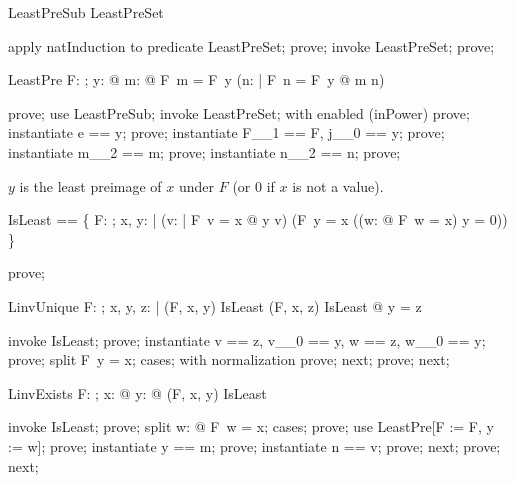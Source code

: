\documentclass{article}
\begin{document}
\begin{theorem}{LeastPreSub}
  \nat \subseteq LeastPreSet
\end{theorem}

\begin{zproof}
apply natInduction to predicate \nat \subseteq LeastPreSet;
prove;
invoke LeastPreSet;
prove;
\end{zproof}

\begin{theorem}{LeastPre}
  \forall F: \nat \fun \nat; y: \nat @ \exists m: \nat @ F~m = F~y \land (\forall n: \nat | F~n = F~y @ m \leq n)
\end{theorem}

\begin{zproof}
prove;
use LeastPreSub;
invoke LeastPreSet;
with enabled (inPower) prove;
instantiate e == y;
prove;
instantiate F\_\_1 == F, j\_\_0 == y;
prove;
instantiate m\_\_2 == m;
prove;
instantiate n\_\_2 == n;
prove;
\end{zproof}


$y$ is the least preimage of $x$ under $F$ (or $0$ if $x$ is not a value).

\begin{zed}
  IsLeast == \{ F: \nat \fun \nat; x, y: \nat | (\forall v: \nat | F~v = x @ y \leq v) \land (F~y = x \lor ((\forall w: \nat @ \lnot F~w = x) \land y = 0)) \}
\end{zed}

\begin{zproof}
prove;
\end{zproof}

\begin{theorem}{LinvUnique}
  \forall F: \nat \fun \nat; x, y, z: \nat | (F, x, y) \in IsLeast \land (F, x, z) \in IsLeast @ y = z
\end{theorem}

\begin{zproof}
invoke IsLeast;
prove;
instantiate v == z, v\_\_0 == y, w == z, w\_\_0 == y;
prove;
split F~y = x;
cases;
with normalization prove;
next;
prove;
next;
\end{zproof}

\begin{theorem}{LinvExists}
  \forall F: \nat \fun \nat; x: \nat @ \exists y: \nat @ (F, x, y) \in IsLeast
\end{theorem}

\begin{zproof}
invoke IsLeast;
prove;
split \exists w: \nat @ F~w = x;
cases;
prove;
use LeastPre[F := F, y := w];
prove;
instantiate y == m;
prove;
instantiate n == v;
prove;
next;
prove;
next;
\end{zproof}
\end{document}
